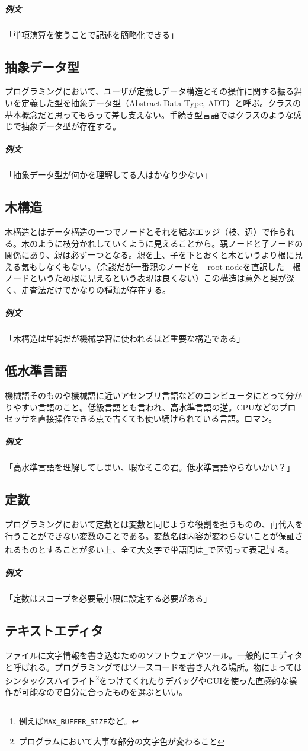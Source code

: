 \documentclass[dvipdfmx,jb5]{jreport}
\newcommand{\terlogy}[2][|]{\colorbox{terlogy}{\texttt{\lstinline#1#2#1}}}
\begin{document}
\subparagraph{例文}「単項演算を使うことで記述を簡略化できる」

\subsection{抽象データ型}
プログラミングにおいて、ユーザが定義しデータ構造とその操作に関する振る舞いを定義した型を抽象データ型（Abstract Data Type, ADT）と呼ぶ。クラスの基本概念だと思ってもらって差し支えない。手続き型言語ではクラスのような感じで抽象データ型が存在する。

\subparagraph{例文}「抽象データ型が何かを理解してる人はかなり少ない」

\subsection{木構造}
木構造とはデータ構造の一つでノードとそれを結ぶエッジ（枝、辺）で作られる。木のように枝分かれしていくように見えることから。親ノードと子ノードの関係にあり、親は必ず一つとなる。親を上、子を下とおくと木というより根に見える気もしなくもない。（余談だが一番親のノードを---root nodeを直訳した---根ノードというため根に見えるという表現は良くない）この構造は意外と奥が深く、走査法だけでかなりの種類が存在する。

\subparagraph{例文}「木構造は単純だが機械学習に使われるほど重要な構造である」

\subsection{低水準言語}
機械語そのものや機械語に近いアセンブリ言語などのコンピュータにとって分かりやすい言語のこと。低級言語とも言われ、高水準言語の逆。CPUなどのプロセッサを直接操作できる点で古くても使い続けられている言語。ロマン。

\subparagraph{例文}「高水準言語を理解してしまい、暇なそこの君。低水準言語やらないかい？」

\subsection{定数}
プログラミングにおいて定数とは変数と同じような役割を担うものの、再代入を行うことができない変数のことである。変数名は内容が変わらないことが保証されるものとすることが多い上、全て大文字で単語間は\terlogy{_}で区切って表記\footnote{例えば\terlogy{MAX_BUFFER_SIZE}など。}する。

\subparagraph{例文}「定数はスコープを必要最小限に設定する必要がある」

\subsection{テキストエディタ}
ファイルに文字情報を書き込むためのソフトウェアやツール。一般的にエディタと呼ばれる。プログラミングではソースコードを書き入れる場所。物によってはシンタックスハイライト\footnote{プログラムにおいて大事な部分の文字色が変わること}をつけてくれたりデバッグやGUIを使った直感的な操作が可能なので自分に合ったものを選ぶといい。
\end{document}
